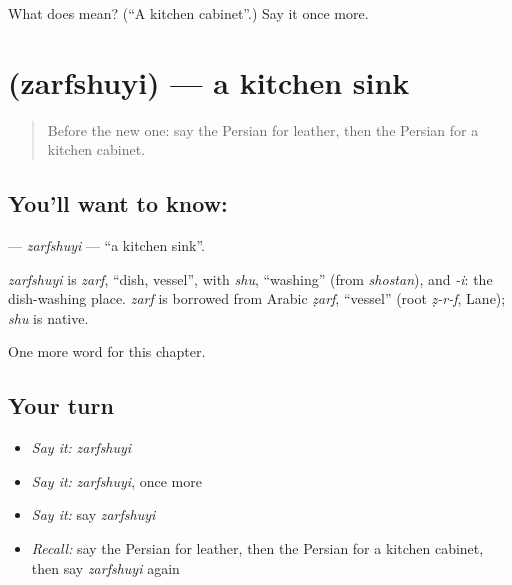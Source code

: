 \begin{tcolorbox}[breakable,colback=teal!4,colframe=teal!35!black,title={Before you move on}]
What does  mean? (\textquotedblleft{}A kitchen cabinet\textquotedblright{}.) Say it once more.
\end{tcolorbox}
\section[\texorpdfstring{\fa{ظرفشویی} (zarfshuyi)}{ظرفشویی (zarfshuyi)}]{ (zarfshuyi) — a kitchen sink}

\label{lesson:FA-C174-zarfshuyi}



\begin{quote}
Before the new one: say the Persian for leather, then the Persian for a kitchen cabinet.
\end{quote}

\subsection*{You'll want to know: }
\textbf{} — \emph{zarfshuyi} — \textquotedblleft{}a kitchen sink\textquotedblright{}.

\begin{cousinweb}
\emph{zarfshuyi} is \emph{zarf}, \textquotedblleft{}dish, vessel\textquotedblright{}, with \emph{shu}, \textquotedblleft{}washing\textquotedblright{} (from \emph{shostan}), and \emph{-i}: the dish-washing place. \emph{zarf} is borrowed from Arabic \emph{ẓarf}, \textquotedblleft{}vessel\textquotedblright{} (root \emph{ẓ-r-f}, Lane); \emph{shu} is native.
\end{cousinweb}

\begin{grammarlens}[title={What you've built}]
One more word for this chapter.
\end{grammarlens}

\subsection*{Your turn}
\begin{itemize}
\raggedright
  \item \emph{Say it:} \emph{zarfshuyi}
  \item \emph{Say it:} \emph{zarfshuyi}, once more
  \item \emph{Say it:} say \emph{zarfshuyi}
  \item \emph{Recall:} say the Persian for leather, then the Persian for a kitchen cabinet, then say \emph{zarfshuyi} again
\end{itemize}

